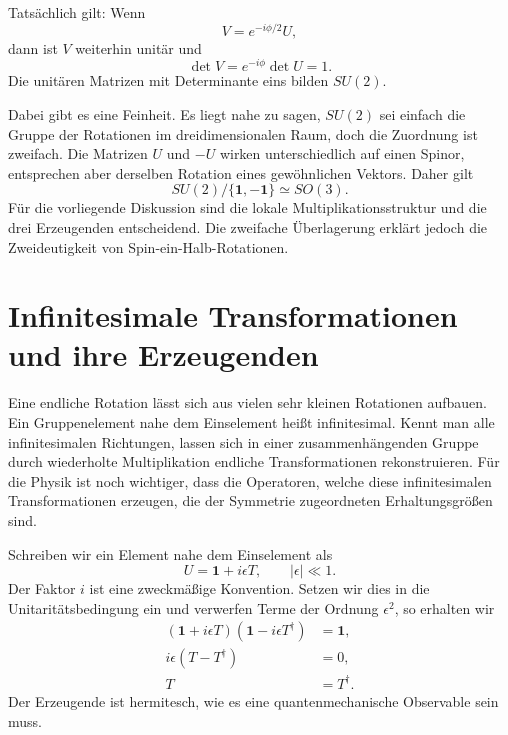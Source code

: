 \begin{classroomqa}
\end{classroomqa}

Tatsächlich gilt: Wenn
\begin{equation}
V=e^{-i\phi/2}U,
\end{equation}
dann ist \(V\) weiterhin unitär und
\begin{equation}
\det V=e^{-i\phi}\det U=1.
\end{equation}
Die unitären Matrizen mit Determinante eins bilden \(SU(2)\).

Dabei gibt es eine Feinheit. Es liegt nahe zu sagen, \(SU(2)\) sei einfach die Gruppe der Rotationen im dreidimensionalen Raum, doch die Zuordnung ist zweifach. Die Matrizen \(U\) und \(-U\) wirken unterschiedlich auf einen Spinor, entsprechen aber derselben Rotation eines gewöhnlichen Vektors. Daher gilt
\begin{equation}
SU(2)/\{\boldsymbol 1,-\boldsymbol 1\}\simeq SO(3).
\end{equation}
Für die vorliegende Diskussion sind die lokale Multiplikationsstruktur und die drei Erzeugenden entscheidend. Die zweifache Überlagerung erklärt jedoch die Zweideutigkeit von Spin-ein-Halb-Rotationen.

\section{Infinitesimale Transformationen und ihre Erzeugenden}

Eine endliche Rotation lässt sich aus vielen sehr kleinen Rotationen aufbauen. Ein Gruppenelement nahe dem Einselement heißt infinitesimal. Kennt man alle infinitesimalen Richtungen, lassen sich in einer zusammenhängenden Gruppe durch wiederholte Multiplikation endliche Transformationen rekonstruieren. Für die Physik ist noch wichtiger, dass die Operatoren, welche diese infinitesimalen Transformationen erzeugen, die der Symmetrie zugeordneten Erhaltungsgrößen sind.

Schreiben wir ein Element nahe dem Einselement als
\begin{equation}
U=\boldsymbol 1+i\epsilon T,
\qquad |\epsilon|\ll1.
\label{eq:l4-infinitesimal-u}
\end{equation}
Der Faktor \(i\) ist eine zweckmäßige Konvention. Setzen wir dies in die Unitaritätsbedingung ein und verwerfen Terme der Ordnung \(\epsilon^2\), so erhalten wir
\begin{align}
(\boldsymbol 1+i\epsilon T)
(\boldsymbol 1-i\epsilon T^\dagger)&=\boldsymbol 1,
\\
i\epsilon(T-T^\dagger)&=0,
\\
T&=T^\dagger.
\label{eq:l4-hermitian-generator}
\end{align}
Der Erzeugende ist hermitesch, wie es eine quantenmechanische Observable sein muss.

